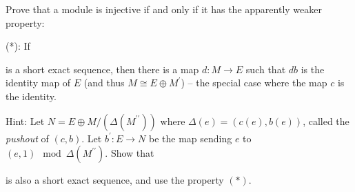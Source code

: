 \documentclass{article}
\begin{document}
Prove that a module is injective if and only if it has the apparently weaker property: 

(*): If
    \begin{center}
    \end{center}
is a short exact sequence, then there is a map $d : M \rightarrow E$ such that $db$ is the identity map of $E$ (and thus $M \cong E \oplus M^{\prime}$) -- the special case where the map $c$ is the identity.

Hint: Let $N = E \oplus M/(\Delta(M^{\prime\prime}))$ where $\Delta(e) = (c(e), b(e))$, called the \textit{pushout} of $(c, b)$. Let $b^{\prime}: E \rightarrow N$ be the map sending $e$ to $(e, 1) \mod{\Delta(M^{\prime\prime})}$. Show that
    \begin{center}
    \end{center}
is also a short exact sequence, and use the property $(*)$.
\end{document}
